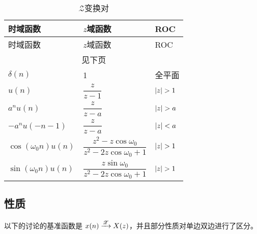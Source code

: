 \documentclass[cn,11pt,chinese,black,simple]{../elegantbook}
\begin{document}
\begin{longtable}{lll} 
    \caption{\(\mathscr{Z}\)变换对} \\ 
    \toprule
    时域函数 & \(z\)域函数 & ROC \\
    \midrule
    \endfirsthead
    
    \toprule
    时域函数 & \(z\)域函数 & ROC \\
    \midrule
    \endhead 
  
    \hline
    \multicolumn{3}{c}{见下页}\\   \bottomrule
    \endfoot
  
    \bottomrule
    \endlastfoot
    \(\delta(n)\) & 1 & 全平面\\
    \(u(n)\) & \(\dfrac{z}{z-1}\) & \(\abs{z}>1\) \\
    \(a^n u(n)\) & \(\dfrac{z}{z-a}\) & \(\abs{z}>a\) \\
    \(-a^n u(-n-1)\) & \(\dfrac{z}{z-a}\) & \(\left| z \right|<a\)\\
    \(\cos(\omega_0 n)u(n)\) & \(\dfrac{z^2-z \cos \omega_0}{z^2 - 2 z \cos\omega_0 + 1}\) & \(\abs{z}>1\) \\
    \(\sin(\omega_0 n)u(n)\) & \(\dfrac{z \sin\omega_0}{z^2 -2 z \cos\omega_0 + 1}\) &  \(\abs{z}>1\) \\

\end{longtable}
  

\subsection{性质}

以下的讨论的基准函数是 \(x(n) \xrightarrow{\mathscr{Z}} X(z)\)，并且部分性质对单边双边进行了区分。
\end{document}
